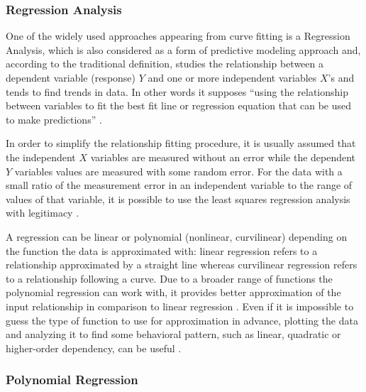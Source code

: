 \subsubsection{Regression Analysis}

One of the widely used approaches appearing from curve fitting is a Regression Analysis, which is also considered as a form of predictive modeling approach and, according to the traditional definition, studies the relationship between a dependent variable (response) $Y$ and one or more independent variables $X$'s and tends to find trends in data. In other words it supposes ``using the relationship between variables to fit the best fit line or regression equation that can be used to make predictions'' \cite{online:intro_lr_pr}.

In order to simplify the relationship fitting procedure, it is usually assumed that the independent $X$ variables are measured without an error while the dependent $Y$ variables values are measured with some random error. For the data with a small ratio of the measurement error in an independent variable to the range of values of that variable, it is possible to use the least squares regression analysis with legitimacy \cite{article:behav_form_extr}.

A regression can be linear or polynomial (nonlinear, curvilinear) depending on the function the data is approximated with: linear regression refers to a relationship approximated by a straight line whereas curvilinear regression refers to a relationship following a curve. Due to a broader range of functions the polynomial regression can work with, it provides better approximation of the input relationship in comparison to linear regression \cite{online:intro_lr_pr}. Even if it is impossible to guess the type of function to use for approximation in advance, plotting the data and analyzing it to find some behavioral pattern, such as linear, quadratic or higher-order dependency, can be useful \cite{article:behav_form_extr}. 

\subsubsection{Polynomial Regression}

